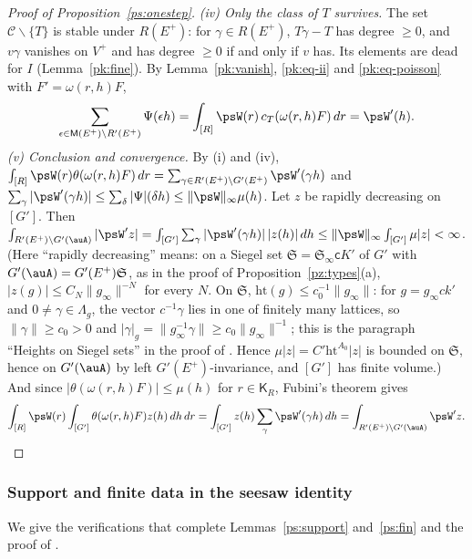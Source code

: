\documentclass[10pt]{amsart}
\theoremstyle{definition}
\theoremstyle{remark}
\begin{document}
\begin{proof}[Proof of Proposition~\ref{ps:onestep}]
\emph{(iv) Only the class of $T$ survives.} The set $\mathcal C\smallsetminus\{T\}$ is stable
under $R(E^+)$: for $\gamma\in R(E^+)$, $T\gamma-T$ has degree $\ge0$, and $v\gamma$ vanishes on
$V^+$ and has degree $\ge0$ if and only if $v$ has. Its elements are dead for $I$
(Lemma~\ref{pk:fine}). By Lemma~\ref{pk:vanish}, \eqref{pk:eq-ii} and \eqref{pk:eq-poisson} with
$F'=\omega(r,h)F$,
\[
\sum_{\epsilon\in\mathsf M(E^+)\backslash R'(E^+)}\Psi(\epsilon h)=\int_{[R]}\psW(r)\,c_T(\omega(r,h)F)
\,dr=\psW'(h).
\]
\emph{(v) Conclusion and convergence.} By (i) and (iv), $\int_{[R]}\psW(r)\theta(\omega(r,h)F)\,dr=
\sum_{\gamma\in R'(E^+)\backslash G'(E^+)}\psW'(\gamma h)$ and $\sum_\gamma|\psW'(\gamma h)|\le
\sum_\delta|\Psi|(\delta h)\le\|\psW\|_\infty\mu(h)$. Let $z$ be rapidly decreasing on $[G']$. Then
$\int_{R'(E^+)\backslash G'(\auA)}|\psW'z|=\int_{[G']}\sum_\gamma|\psW'(\gamma h)|\,|z(h)|\,dh\le
\|\psW\|_\infty\int_{[G']}\mu|z|<\infty$. (Here ``rapidly decreasing'' means: on a Siegel set
$\mathfrak S=\mathfrak S_\infty\mathsf cK'$ of $G'$ with $G'(\auA)=G'(E^+)\mathfrak S$, as in the proof of
Proposition~\ref{pz:types}(a), $|z(g)|\le C_N\|g_\infty\|^{-N}$ for every $N$. On $\mathfrak S$,
$\mathrm{ht}(g)\le c_0^{-1}\|g_\infty\|$: for $g=g_\infty ck'$ and $0\ne\gamma\in\Lambda_g$, the vector
$c^{-1}\gamma$ lies in one of finitely many lattices, so $\|\gamma\|\ge c_0>0$ and $|\gamma|_g=
\|g_\infty^{-1}\gamma\|\ge c_0\|g_\infty\|^{-1}$; this is the paragraph ``Heights on Siegel sets'' in the
proof of {\cite[Proposition~4.10]{P53}}. Hence $\mu|z|=C'\mathrm{ht}^{A_0}|z|$ is bounded on $\mathfrak S$, hence
on $G'(\auA)$ by left $G'(E^+)$-invariance, and $[G']$ has finite volume.) And since $|\theta(\omega(r,h)F)|\le\mu(h)$ for
$r\in\mathsf K_R$, Fubini's theorem gives
\[
\int_{[R]}\psW(r)\int_{[G']}\theta(\omega(r,h)F)z(h)\,dh\,dr=\int_{[G']}z(h)\sum_\gamma\psW'(\gamma h)
\,dh=\int_{R'(E^+)\backslash G'(\auA)}\psW'z .\qedhere
\]
\end{proof}

\subsubsection{Support and finite data in the seesaw identity}\label{pk:ss-rest}

We give the verifications that complete Lemmas~\ref{ps:support} and~\ref{ps:fin} and the proof
of {\cite[Proposition~14.23]{P46}}.
\end{document}
